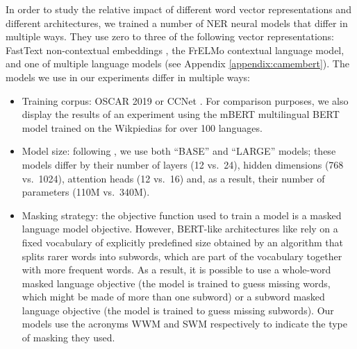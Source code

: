 In order to study the relative impact of different word vector representations and different architectures, we trained a number of NER neural models that differ in multiple ways. They use zero to three of the following vector representations: FastText non-contextual embeddings \citep{bojanowski-etal-2017-enriching}, the FrELMo contextual language model, and one of multiple \camembert language models \citep{martin-etal-2020-camembert} (see Appendix \ref{appendix:camembert}). The \camembert models we use in our experiments differ in multiple ways:
\begin{itemize}
    \item Training corpus: OSCAR 2019 or CCNet \citep{wenzek-etal-2020-ccnet}. For comparison purposes, we also display the results of an experiment using the mBERT multilingual BERT model trained on the Wikpiedias for over 100 languages.
    \item Model size: following \citet{devlin-etal-2019-bert}, we use both ``BASE'' and ``LARGE'' models; these models differ by their number of layers (12 vs.~24), hidden dimensions (768 vs.~1024), attention heads (12 vs.~16) and, as a result, their number of parameters (110M vs.~340M).
    \item Masking strategy: the objective function used to train a \camembert model is a masked language model objective. However, BERT-like architectures like \camembert rely on a fixed vocabulary of explicitly predefined size obtained by an algorithm that splits rarer words into subwords, which are part of the vocabulary together with more frequent words. As a result, it is possible to use a whole-word masked language objective (the model is trained to guess missing words, which might be made of more than one subword) or a subword masked language objective (the model is trained to guess missing subwords). Our models use the acronyms WWM and SWM respectively to indicate the type of masking they used.
\end{itemize}

